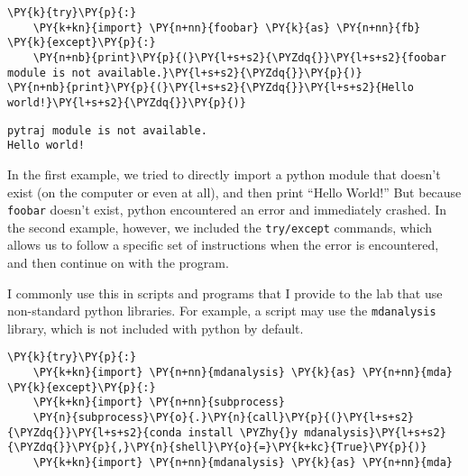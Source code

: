     \begin{tcolorbox}[breakable, size=fbox, boxrule=1pt, pad at break*=1mm,colback=cellbackground, colframe=cellborder]
\begin{Verbatim}[commandchars=\\\{\}]
\PY{k}{try}\PY{p}{:}
    \PY{k+kn}{import} \PY{n+nn}{foobar} \PY{k}{as} \PY{n+nn}{fb}
\PY{k}{except}\PY{p}{:}
    \PY{n+nb}{print}\PY{p}{(}\PY{l+s+s2}{\PYZdq{}}\PY{l+s+s2}{foobar module is not available.}\PY{l+s+s2}{\PYZdq{}}\PY{p}{)}
\PY{n+nb}{print}\PY{p}{(}\PY{l+s+s2}{\PYZdq{}}\PY{l+s+s2}{Hello world!}\PY{l+s+s2}{\PYZdq{}}\PY{p}{)}
\end{Verbatim}
\end{tcolorbox}

    \begin{Verbatim}[commandchars=\\\{\}]
pytraj module is not available.
Hello world!
    \end{Verbatim}

    In the first example, we tried to directly import a python module that
doesn't exist (on the computer or even at all), and then print ``Hello
World!'' But because \texttt{foobar} doesn't exist, python encountered
an error and immediately crashed. In the second example, however, we
included the \texttt{try/except} commands, which allows us to follow a
specific set of instructions when the error is encountered, and then
continue on with the program.

I commonly use this in scripts and programs that I provide to the lab
that use non-standard python libraries. For example, a script may use
the \texttt{mdanalysis} library, which is not included with python by
default.

    \begin{tcolorbox}[breakable, size=fbox, boxrule=1pt, pad at break*=1mm,colback=cellbackground, colframe=cellborder]
\begin{Verbatim}[commandchars=\\\{\}]
\PY{k}{try}\PY{p}{:}
    \PY{k+kn}{import} \PY{n+nn}{mdanalysis} \PY{k}{as} \PY{n+nn}{mda}
\PY{k}{except}\PY{p}{:}
    \PY{k+kn}{import} \PY{n+nn}{subprocess}
    \PY{n}{subprocess}\PY{o}{.}\PY{n}{call}\PY{p}{(}\PY{l+s+s2}{\PYZdq{}}\PY{l+s+s2}{conda install \PYZhy{}y mdanalysis}\PY{l+s+s2}{\PYZdq{}}\PY{p}{,}\PY{n}{shell}\PY{o}{=}\PY{k+kc}{True}\PY{p}{)}
    \PY{k+kn}{import} \PY{n+nn}{mdanalysis} \PY{k}{as} \PY{n+nn}{mda}
\end{Verbatim}
\end{tcolorbox}

